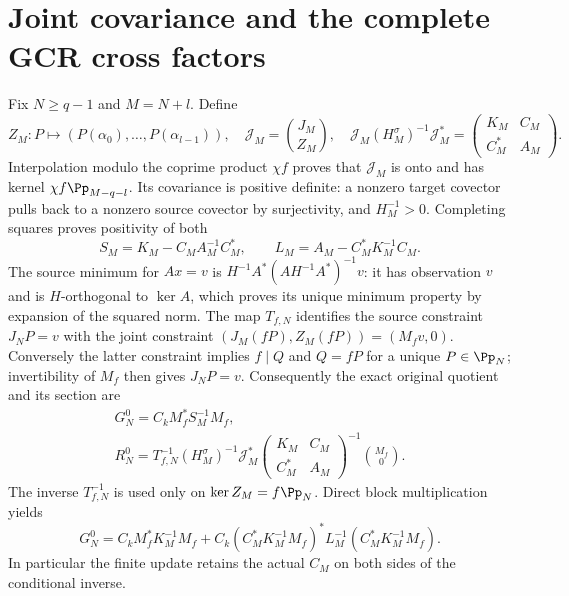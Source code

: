 \section{Joint covariance and the complete GCR cross factors}

Fix $N\geq q-1$ and $M=N+l$. Define
\[
 Z_M:P\mapsto(P(\alpha_0),\ldots,P(\alpha_{l-1})),\quad
 \mathscr J_M=\binom{J_M}{Z_M},\quad
 \mathscr J_M(H_M^\sigma)^{-1}\mathscr J_M^*
   =\begin{pmatrix}K_M&C_M\\C_M^*&A_M\end{pmatrix}.
\tag{JSA12}
\]
Interpolation modulo the coprime product $\chi f$ proves that
$\mathscr J_M$ is onto and has kernel $\chi f\Pp_{M-q-l}$.
Its covariance is positive definite: a nonzero target covector
pulls back to a nonzero source covector by surjectivity, and
$H_M^{-1}>0$. Completing squares proves positivity of both
\[
 S_M=K_M-C_MA_M^{-1}C_M^*,\qquad
 L_M=A_M-C_M^*K_M^{-1}C_M.
\tag{JSA13}
\]
The source minimum for $Ax=v$ is
$H^{-1}A^*(AH^{-1}A^*)^{-1}v$: it has observation $v$ and is
$H$-orthogonal to $\ker A$, which proves its unique minimum
property by expansion of the squared norm. The map $T_{f,N}$
identifies the source constraint $J_NP=v$ with the joint
constraint $(J_M(fP),Z_M(fP))=(M_fv,0)$. Conversely the latter
constraint implies $f\mid Q$ and $Q=fP$ for a unique
$P\in\Pp_N$; invertibility of $M_f$ then gives $J_NP=v$.
Consequently the exact original quotient and its section are
\[
\begin{gathered}
 G_N^0=C_k M_f^*S_M^{-1}M_f,\\
 R_N^0=T_{f,N}^{-1}(H_M^\sigma)^{-1}\mathscr J_M^*
   \begin{pmatrix}K_M&C_M\\C_M^*&A_M\end{pmatrix}^{-1}
   \binom{M_f}{0}.
\end{gathered}\tag{JSA14}
\]
The inverse $T_{f,N}^{-1}$ is used only on $\ker Z_M=f\Pp_N$.
Direct block multiplication yields
\[
 G_N^0=C_kM_f^*K_M^{-1}M_f
       +C_k(C_M^*K_M^{-1}M_f)^*L_M^{-1}
                    (C_M^*K_M^{-1}M_f).
\tag{JSA15}
\]
In particular the finite update retains the actual $C_M$ on
both sides of the conditional inverse.

